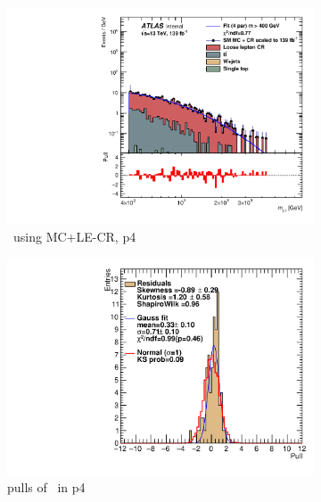 \newpage

\begin{figure}[ht]
    \centering
    \begin{subfigure}[h]{0.38\linewidth}
    \includegraphics[scale=0.3]{figs/ch6/fit/variable_nosmooth/p4/01PB/output_SMMCplusCR_Mjg_p4.pdf}%
    \caption{\mjph \ using MC+LE-CR, p4}
    \end{subfigure}
    \hfill
    \begin{subfigure}[h]{0.4\linewidth}
    \includegraphics[scale=0.32]{figs/ch6/fit/variable_nosmooth/p4/01PB/pull_SMMCplusCR_Mjg_p4.pdf}%
    \caption{pulls of \mjph \ in p4}
    \end{subfigure}
    \hfill
    \begin{subfigure}[h]{0.38\linewidth}

\end{subfigure}
\end{figure}
